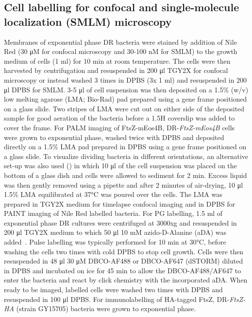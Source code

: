 \subsection[Cell labelling for confocal and SMLM microscopy]{Cell labelling for confocal and single-molecule localization (SMLM) microscopy}

Membranes of exponential phase DR bacteria were stained by addition of Nile Red (30 μM for confocal microscopy and 30-100 nM for SMLM) to the growth medium of cells (1 ml) for 10 min at room temperature.
The cells were then harvested by centrifugation and resuspended in 200 μl TGY2X for confocal microscopy or instead washed 3 times in DPBS (3x 1 ml) and resuspended in 200 μl DPBS for SMLM.
3-5 μl of cell suspension was then deposited on a 1.5\% (w/v) low melting agarose (LMA; Bio-Rad) pad prepared using a gene frame positioned on a glass slide.
Two stripes of LMA were cut out on either side of the deposited sample for good aeration of the bacteria before a 1.5H coverslip was added to cover the frame.
For PALM imaging of FtsZ-mEos4B, DR-\textit{FtsZ-mEos4B} cells were grown to exponential phase, washed twice with DPBS and deposited directly on a 1.5\% LMA pad prepared in DPBS using a gene frame positioned on a glass slide.
To visualize dividing bacteria in different orientations, an alternative set-up was also used () in which 10 μl of the cell suspension was placed on the bottom of a glass dish and cells were allowed to sediment for 2 min.
Excess liquid was then gently removed using a pipette and after 2 minutes of air-drying, 10 μl 1.5\% LMA equilibrated at 37°C was poured over the cells.
The LMA was prepared in TGY2X medium for timelapse confocal imaging and in DPBS for PAINT imaging of Nile Red labelled bacteria.
For PG labelling, 1.5 ml of exponential phase DR cultures were centrifuged at 3000xg and resuspended in 200 μl TGY2X medium to which 50 μl 10 mM azido-D-Alanine (aDA) was added~\cite{trouveNanoscaleDynamicsPeptidoglycan2021,trouveMetabolicBiorthogonalLabeling2021}.
Pulse labelling was typically performed for 10 min at 30°C, before washing the cells two times with cold DPBS to stop cell growth.
Cells were then resuspended in 48 μl 30 μM DBCO-AF488 or DBCO-AF647 (dSTORM) diluted in DPBS and incubated on ice for 45 min to allow the DBCO-AF488/AF647 to enter the bacteria and react by click chemistry with the incorporated aDA.
When ready to be imaged, labelled cells were washed two times with DPBS and resuspended in 100 μl DPBS.
For immunolabelling of HA-tagged FtsZ, DR-\textit{FtsZ-HA} (strain GY15705) bacteria were grown to exponential phase.
